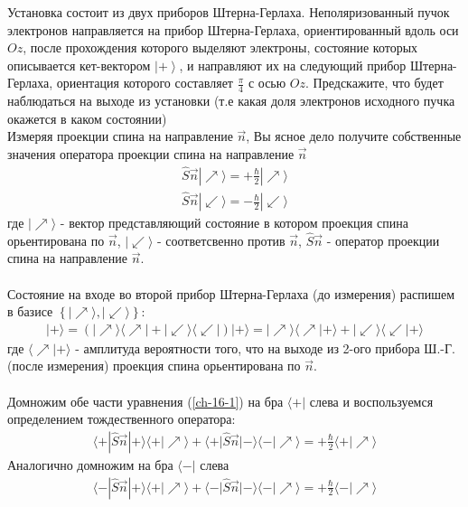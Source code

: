 \documentclass[__main__.tex]{subfiles}
\begin{document}
	
	Установка состоит из двух приборов Штерна-Герлаха. Неполяризованный пучок электронов направляется на прибор Штерна-Герлаха, ориентированный вдоль оси $Oz$, после прохождения которого выделяют электроны, состояние которых описывается кет-вектором $\left|+\right>$, и направляют их на следующий прибор Штерна-Герлаха, ориентация которого составляет $\frac{\pi}{4}$ с осью $Oz$. Предскажите, что будет наблюдаться на выходе из установки (т.е какая доля электронов исходного пучка окажется в каком состоянии)\\ 
	
	Измеряя проекции спина на направление $\vec{n}$, Вы ясное дело получите собственные значения оператора проекции спина на направление $\vec{n}$
	\begin{gather}
		\label{ch-16-1}
		\hat{S}\vec{n}|\nearrow \rangle = +\frac{\hbar}{2}|\nearrow \rangle\\
		\hat{S}\vec{n}|\swarrow \rangle = -\frac{\hbar}{2}|\swarrow \rangle
	\end{gather}
	где $|\nearrow \rangle$ - вектор представляющий состояние в котором проекция спина орьентирована по $\vec{n}$, $|\swarrow \rangle$ - соответсвенно против $\vec{n}$, $\hat{S}\vec{n}$ - оператор проекции спина на направление $\vec{n}$.\\\\
	Состояние на входе во второй прибор Штерна-Герлаха (до измерения) распишем в базисе $\left\{|\nearrow\rangle , |\swarrow \rangle \right\}$:
	\begin{gather*}
		|+\rangle = \left(|\nearrow\rangle\langle\nearrow|+|\swarrow\rangle\langle\swarrow|\right)|+\rangle = |\nearrow\rangle\langle\nearrow|+\rangle+|\swarrow\rangle\langle\swarrow|+\rangle
	\end{gather*}
	где $\langle\nearrow|+\rangle$ - амплитуда вероятности того, что на выходе из 2-ого прибора Ш.-Г.(после измерения) проекция спина орьентирована по $\vec{n}$.\\\\
	Домножим обе части уравнения (\ref{ch-16-1}) на бра $\langle+|$ слева и воспользуемся определением тождественного оператора:
	\begin{gather}
		\label{ch-16-2}
		\langle+|\hat{S}\vec{n}|+\rangle\langle+|\nearrow\rangle+\langle+|\hat{S}\vec{n}|-\rangle\langle-|\nearrow\rangle = +\frac{\hbar}{2}\langle+|\nearrow\rangle
	\end{gather}
	Аналогично домножим на бра $\langle-|$ слева
	\begin{gather}
		\label{ch-16-3}
		\langle-|\hat{S}\vec{n}|+\rangle\langle+|\nearrow\rangle+\langle-|\hat{S}\vec{n}|-\rangle\langle-|\nearrow\rangle = +\frac{\hbar}{2}\langle-|\nearrow\rangle
	\end{gather}
\end{document}

